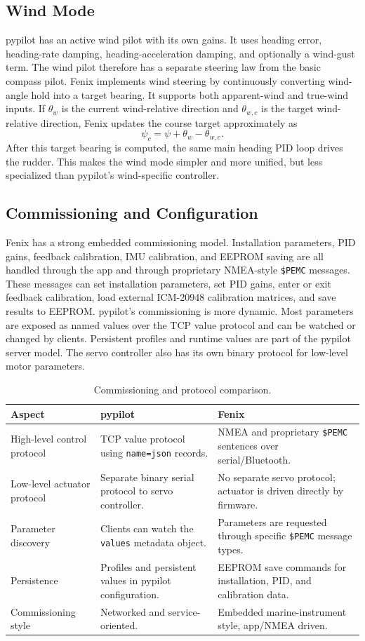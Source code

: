 \documentclass[11pt,twocolumn]{article}
\begin{document}
\subsection{Wind Mode}
pypilot has an active wind pilot with its own gains.  It uses heading
error, heading-rate damping, heading-acceleration damping, and optionally
a wind-gust term.  The wind pilot therefore has a separate steering law
from the basic compass pilot.
Fenix implements wind steering by continuously converting wind-angle hold
into a target bearing.  It supports both apparent-wind and true-wind
inputs.  If \(\theta_w\) is the current wind-relative direction and
\(\theta_{w,c}\) is the target wind-relative direction, Fenix updates the
course target approximately as
\[
\psi_c
=
\psi
+
\theta_w
-
\theta_{w,c}.
\]
After this target bearing is computed, the same main heading PID loop
drives the rudder.  This makes the wind mode simpler and more unified, but
less specialized than pypilot's wind-specific controller.
\subsection{Commissioning and Configuration}
Fenix has a strong embedded commissioning model.  Installation parameters,
PID gains, feedback calibration, IMU calibration, and EEPROM saving are
all handled through the app and through proprietary NMEA-style
\texttt{\$PEMC} messages.  These messages can set installation parameters,
set PID gains, enter or exit feedback calibration, load external
ICM-20948 calibration matrices, and save results to EEPROM.
pypilot's commissioning is more dynamic.  Most parameters are exposed as
named values over the TCP value protocol and can be watched or changed by
clients.  Persistent profiles and runtime values are part of the pypilot
server model.  The servo controller also has its own binary protocol for
low-level motor parameters.
\begin{table}[t]
\centering
\caption{Commissioning and protocol comparison.}
\label{tab:pypilot-fenix-protocol}
\begin{tabularx}{\textwidth}{Z{0.18\textwidth}YY}
\toprule
Aspect & pypilot & Fenix \\
\midrule
High-level control protocol &
TCP value protocol using \texttt{name=json} records. &
NMEA and proprietary \texttt{\$PEMC} sentences over serial/Bluetooth. \\
Low-level actuator protocol &
Separate binary serial protocol to servo controller. &
No separate servo protocol; actuator is driven directly by firmware. \\
Parameter discovery &
Clients can watch the \texttt{values} metadata object. &
Parameters are requested through specific \texttt{\$PEMC} message types. \\
Persistence &
Profiles and persistent values in pypilot configuration. &
EEPROM save commands for installation, PID, and calibration data. \\
Commissioning style &
Networked and service-oriented. &
Embedded marine-instrument style, app/NMEA driven. \\
\bottomrule
\end{tabularx}
\end{table}
\end{document}
